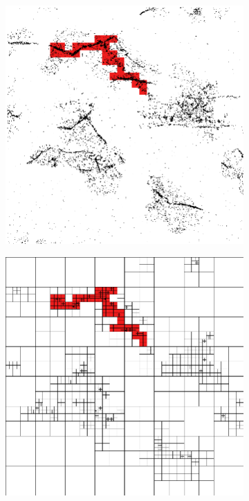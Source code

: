 \begin{figure}[tbhp]
	\centering
	\begin{subfigure}[c]{4.2cm}
		\includegraphics[width=\textwidth]{single-cluster.png}
		\caption{}\label{fig:single-cluster-points}
	\end{subfigure}%
	\quad
	\begin{subfigure}[c]{4.2cm}
		\includegraphics[width=\textwidth]{single-cluster-lines.png}
		\caption{}\label{fig:single-cluster-lines}
	\end{subfigure}


\end{figure}
